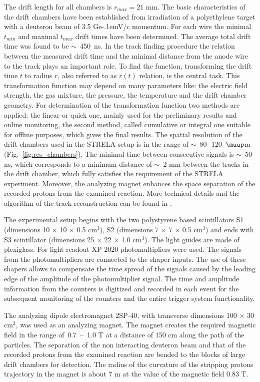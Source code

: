 \documentclass[twocolumn,epjc3]{svjour3}
\newcommand{\GeVc}   {Ge\kern-.1emV/c\xspace}
\begin{document}
The drift length for all chambers is $r_{max} = 21$ mm. The basic
characteristics of the drift chambers have been established from irradiation of
a polyethylene target with a deuteron beam of 3.5 \GeVc momentum. For each wire
the minimal $t_{min}$ and maximal $t_{max}$ drift times have been
determined. The average total drift time was found to be $\sim$~450~ns. In the
track finding procedure the relation between the measured drift time and the
minimal distance from the anode wire to the track plays an important role. To
find the function, transforming the drift time $t$ to radius $r$, also referred
to as $r(t)$ relation, is the central task. This transformation function may
depend on many parameters like: the electric field strength, the gas mixture,
the pressure, the temperature and the drift chamber geometry. For determination
of the transformation function two methods are applied: the linear or quick one,
mainly used for the preliminary results and online monitoring, the second
method, called cumulative or integral one suitable for offline purposes, which
gives the final results. The spatial resolution of the drift chambers used in
the STRELA setup is in the range of $\sim$~80\,--120~$\muup$m
(Fig.~\ref{fig:res_chambers}). The minimal time between consecutive signals is
$\sim$~50 ns, which corresponds to a minimum distance of $\sim$~2 mm between the
tracks in the drift chamber, which fully satisfies the requirement of the STRELA
experiment. Moreover, the analyzing magnet enhances the space separation of the
recorded protons from the examined reaction. More technical details and the
algorithm of the track reconstruction can be found in \cite{gla13}.

The experimental setup begins with the two polystyrene based scintillators S1
(dimensions 10 $\times$ 10 $\times$ 0.5 cm$^3$), S2 (dimensions 7 $\times$ 7
$\times$ 0.5 cm$^3$) and ends with S3 scintillator (dimensions 25 $\times$ 22
$\times$ 1.0 cm$^3$). The light guides are made of plexiglass. For light readout
XP 2020 photomultipliers were used. The signals from the photomultipliers are
connected to the shaper inputs. The use of these shapers allows to compensate
the time spread of the signals caused by the leading edge of the amplitude of
the photomultiplier signal. The time and amplitude information from the counters
is digitized and recorded in each event for the subsequent monitoring of the
counters and the entire trigger system functionality.

The analyzing dipole electromagnet 2SP-40, with transverse dimensions 100
$\times$ 30 cm$^2$, was used as an analyzing magnet. The magnet creates the
required magnetic field in the range of \,0.7~--~1.0 T at a distance of 150 cm
along the path of the particles. The separation of the non interacting deuteron
beam and that of the recorded protons from the examined reaction are bended to
the blocks of large drift chambers for detection. The radius of the curvature of
the stripping protons trajectory in the magnet is about 7 m at the value of the
magnetic field 0.83 T.
\end{document}
